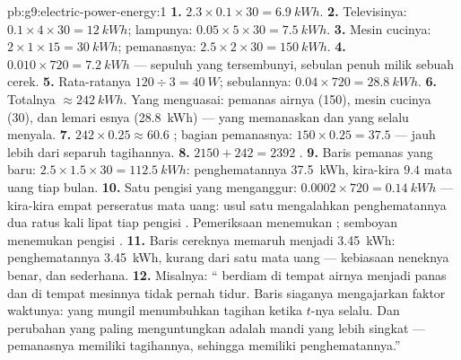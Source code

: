 \begin{solution}{pb:g9:electric-power-energy:1}
\textbf{1.} $2.3 \times 0.1 \times 30 = \qty{6.9}{kWh}$.
\textbf{2.} Televisinya: $0.1 \times 4 \times 30 =
\qty{12}{kWh}$; lampunya: $0.05 \times 5 \times 30 =
\qty{7.5}{kWh}$.
\textbf{3.} Mesin cucinya: $2 \times 1 \times 15 = \qty{30}{kWh}$;
pemanasnya: $2.5 \times 2 \times 30 = \qty{150}{kWh}$.
\textbf{4.} $0.010 \times 720 = \qty{7.2}{kWh}$ --- sepuluh  yang
tersembunyi, sebulan penuh milik sebuah cerek.
\textbf{5.} Rata-ratanya $120 \div 3 = \qty{40}{W}$; sebulannya:
$0.04 \times 720 = \qty{28.8}{kWh}$.
\textbf{6.} Totalnya $\approx \qty{242}{kWh}$. Yang menguasai: pemanas
airnya (\qty{150}{}), mesin cucinya (\qty{30}{}), dan lemari esnya
(\qty{28.8}{kWh}) --- yang memanaskan dan yang selalu menyala.
\textbf{7.} $242 \times 0.25 \approx 60.6$ ; bagian pemanasnya:
$150 \times 0.25 = 37.5$ --- jauh lebih dari separuh tagihannya.
\textbf{8.} $2150 + 242 = 2392$ .
\textbf{9.} Baris pemanas yang baru: $2.5 \times 1.5 \times 30 =
\qty{112.5}{kWh}$: penghematannya \qty{37.5}{kWh}, kira-kira $9.4$
 mata uang tiap bulan.
\textbf{10.} Satu pengisi  yang menganggur: $0.0002 \times 720 =
\qty{0.14}{kWh}$ --- kira-kira empat perseratus  mata uang:
usul satu mengalahkan penghematannya dua ratus kali lipat tiap
pengisi . Pemeriksaan menemukan ; semboyan menemukan
pengisi .
\textbf{11.} Baris cereknya memaruh menjadi \qty{3.45}{kWh}:
penghematannya \qty{3.45}{kWh}, kurang dari satu  mata uang ---
kebiasaan neneknya benar, dan sederhana.
\textbf{12.} Misalnya: `` berdiam di tempat airnya
menjadi panas dan di tempat mesinnya tidak pernah tidur. Baris
siaganya mengajarkan faktor waktunya:  yang mungil menumbuhkan
tagihan ketika $t$-nya selalu. Dan perubahan yang paling menguntungkan
adalah mandi yang lebih singkat --- pemanasnya memiliki tagihannya,
sehingga  memiliki penghematannya.''
\end{solution}

